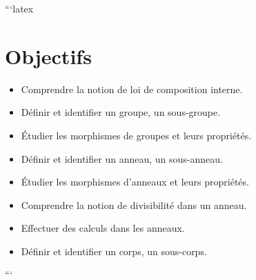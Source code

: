 ```latex
\section{Objectifs}
\begin{itemize}
    \item Comprendre la notion de loi de composition interne.
    \item Définir et identifier un groupe, un sous-groupe.
    \item Étudier les morphismes de groupes et leurs propriétés.
    \item Définir et identifier un anneau, un sous-anneau.
    \item Étudier les morphismes d'anneaux et leurs propriétés.
    \item Comprendre la notion de divisibilité dans un anneau.
    \item Effectuer des calculs dans les anneaux.
    \item Définir et identifier un corps, un sous-corps.
\end{itemize}
```
